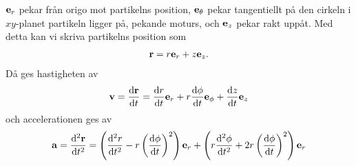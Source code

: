 $\vect{e}_{r}$ pekar från origo mot partikelns position, $\vect{e}_{\theta}$ pekar tangentiellt på den cirkeln i $xy$-planet partikeln ligger på, pekande moturs, och $\vect{e}_{z}$ pekar rakt uppåt. Med detta kan vi skriva partikelns position som
\begin{align*}
	\vect{r} = r\vect{e}_{r} + z\vect{e}_{z}.
\end{align*}
Då ges hastigheten av
\begin{align*}
	\vect{v} = \dv{\vect{r}}{t} = \dv{r}{t}\vect{e}_{r} + r\dv{\phi}{t}\vect{e}_{\phi} + \dv{z}{t}\vect{e}_{z}
\end{align*}
och accelerationen ges av
\begin{align*}
	\vect{a} = \dv[2]{\vect{r}}{t} = \left(\dv[2]{r}{t} - r\left(\dv{\phi}{t}\right)^2\right)\vect{e}_{r} + \left(r\dv[2]{\phi}{t} + 2r\left(\dv{\phi}{t}\right)^2\right)\vect{e}_{r}
\end{align*}